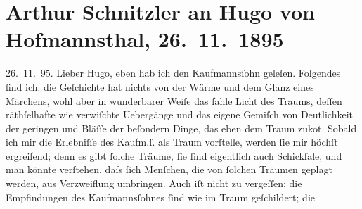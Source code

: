 

         
         \renewcommand{\erwaehntePersonen}{Personen: Hugo von Hofmannsthal}
         \renewcommand{\erwaehnteOrte}{Orte: Wien}
         \renewcommand{\erwaehnteWerke}{Werke: Das Märchen der 672. Nacht}
               \section[Arthur Schnitzler an Hugo von Hofmannsthal, 26. 11. 1895]{ Arthur Schnitzler an Hugo von Hofmannsthal, 26. 11. 1895}\nopagebreak{}\rehead{ }\begin{ledgroupsized}[t]{13cm}\normalsize\beginnumbering \toendnotes[C]{\smallbreak\pagebreak[2]} 
\toendnotes[C]{\smallbreak}\pstart
           \raggedleft{}{\pb}26. 11. 95.\pend
           \pstart
           Lieber Hugo, eben hab ich den Kaufmannsſohn geleſen. Folgendes find ich: die Geſchichte hat nichts von der
               Wärme und dem Glanz eines Märchens, wohl aber in wunderbarer Weiſe das fahle Licht
               des Traums, deſſen räthſelhafte wie verwiſchte Uebergänge und das eigene Gemiſch von
               Deutlichkeit der geringen und Bläſſe der beſondern Dinge, das eben dem Traum zuko{\geminationm}t. Sobald ich mir die Erlebniſſe des Kaufm.ſ. als Traum vorſtelle, werden ſie mir
               höchſt ergreifend; denn es gibt ſolche Träume, ſie ſind eigentlich auch Schickſale,
               und man könnte verſtehen, daſs ſich Menſchen, die von ſolchen Träumen geplagt {\pb}werden, aus Verzweiflung umbringen. Auch iſt nicht zu
               vergeſſen: die Empfindungen des Kaufmannsſohnes ſind wie im Traum geſchildert; die

\end{ledgroupsized}
